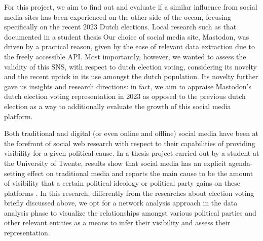 For this project, we aim to find out and evaluate if a similar influence from social media sites has been experienced on the other side of the ocean, focusing specifically on the recent 2023 Dutch elections. Local research such as that documented in a student thesis Our choice of social media site, Mastodon, was driven by a practical reason, given by the ease of relevant data extraction due to the freely accessible API. Most importantly, however, we wanted to assess the validity of this SNS, with respect to dutch election voting, considering its novelty and the recent uptick in its use amongst the dutch population. Its novelty further gave us insights and research directions: in fact, we aim to appraise Mastodon's dutch election voting representation in 2023 as opposed to the previous dutch election as a way to additionally evaluate the growth of this social media platform. 

Both traditional and digital (or even online and offline) social media have been at the forefront of social web research with respect to their capabilities of providing visibility for a given political cause. In a thesis project carried out by a student at the University of Twente, results show that social media has an explicit agenda-setting effect on traditional media and reports the main cause to be the amount of visibility that a certain political ideology or political party gains on these platforms \cite{socialmediavisibility}.
In this research, differently from the researches about election voting briefly discussed above, we opt for a network analysis approach in the data analysis phase to visualize the relationships amongst various political parties and other relevant entities as a means to infer their visibility and assess their representation. 

